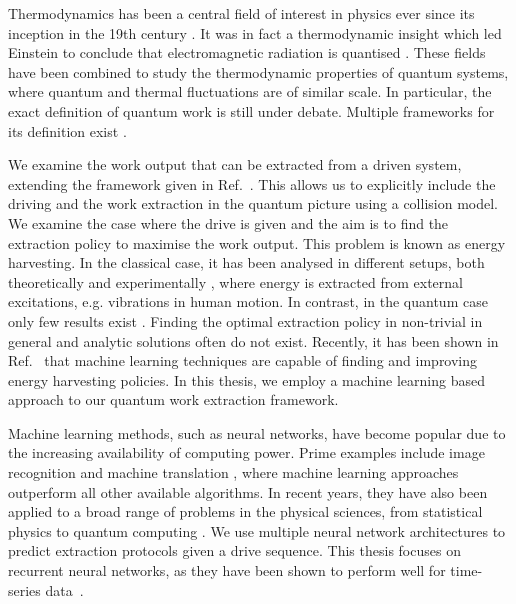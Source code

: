 Thermodynamics has been a central field of interest in physics ever since its inception in the 19th century \cite{thomson_2011}.
It was in fact a thermodynamic insight which led Einstein to conclude that electromagnetic radiation is quantised \cite{1905AnP...322..132E}.
These fields have been combined to study the thermodynamic properties of quantum systems, where quantum and thermal fluctuations are of similar scale.
In particular, the exact definition of quantum work is still under debate.
Multiple frameworks for its definition exist \cite{Egloff_2015, PhysRevE.93.022131}.

We examine the work output that can be extracted from a driven system, extending the framework given in Ref.~\cite{beyer2020}.
This allows us to explicitly include the driving and the work extraction in the quantum picture using a collision model.
We examine the case where the drive is given and the aim is to find the extraction policy to maximise the work output.
This problem is known as energy harvesting.
In the classical case, it has been analysed in different setups, both theoretically \cite{WEI20171} and experimentally \cite{expharv}, where energy is extracted from external excitations, e.g. vibrations in human motion.
In contrast, in the quantum case only few results exist \cite{sothmann}.
Finding the optimal extraction policy in non-trivial in general and analytic solutions often do not exist.
Recently, it has been shown in Ref.~\cite{Liu2019} that machine learning techniques are capable of finding and improving energy harvesting policies.
In this thesis, we employ a machine learning based approach to our quantum work extraction framework.

Machine learning methods, such as neural networks, have become popular due to the increasing availability of computing power.
Prime examples include image recognition and machine translation \cite{DBLP:journals/corr/VaswaniSPUJGKP17}, where machine learning approaches outperform all other available algorithms.
In recent years, they have also been applied to a broad range of problems in the physical sciences, from statistical physics to quantum computing \cite{Carleo_2019, wise2021using}.
We use multiple neural network architectures to predict extraction protocols given a drive sequence.
This thesis focuses on recurrent neural networks, as they have been shown to perform well for time-series data~\cite{8614252}.

